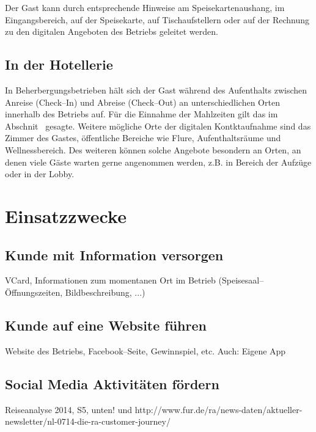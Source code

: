 Der Gast kann durch entsprechende Hinweise am Speisekartenaushang, im Eingangsbereich, auf der Speisekarte, auf Tischaufstellern oder auf der Rechnung zu den digitalen Angeboten des Betriebs geleitet werden.

\subsection{In der Hotellerie} %
\label{sub:hotellerie}
In Beherbergungsbetrieben hält sich der Gast während des Aufenthalts zwischen Anreise (Check–In) und Abreise (Check–Out) an unterschiedlichen Orten innerhalb des Betriebs auf. Für die Einnahme der Mahlzeiten gilt das im Abschnit~ gesagte. Weitere mögliche Orte der digitalen Kontktaufnahme sind das Zimmer des Gastes, öffentliche Bereiche wie Flure, Aufenthaltsräume und Wellnessbereich. Des weiteren können solche Angebote besondern an Orten, an denen viele Gäste warten gerne angenommen werden, z.B. in Bereich der Aufzüge oder in der Lobby.




\newpage
\section{Einsatzzwecke} %
\label{sec:einsatzzwecke}

\subsection{Kunde mit Information versorgen} %
\label{sub:kunde_mit_information_versorgen}
VCard, Informationen zum momentanen Ort im Betrieb (Speisesaal--Öffnungszeiten, Bildbeschreibung, ...)


\subsection{Kunde auf eine Website führen} %
\label{sub:kunde_auf_eine_website_fuhren}
Website des Betriebs, Facebook--Seite, Gewinnspiel, etc.
Auch: Eigene App

\subsection{Social Media Aktivitäten fördern} %
\label{sub:social_media_aktivitaten_fordern}
Reiseanalyse 2014, S5, unten! und http://www.fur.de/ra/news-daten/aktueller-newsletter/nl-0714-die-ra-customer-journey/ 

